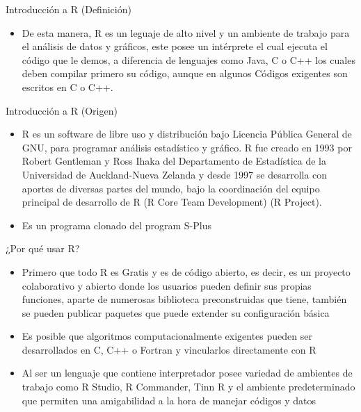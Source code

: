 \documentclass[ignorenonframetext,]{beamer}
\providecommand{\tightlist}{%
  \setlength{\itemsep}{0pt}\setlength{\parskip}{0pt}}
\begin{document}
\begin{frame}{Introducción a R (Definición)}

\begin{itemize}
\tightlist
\item
  De esta manera, R es un leguaje de alto nivel y un ambiente de trabajo
  para el análisis de datos y gráficos, este posee un intérprete el cual
  ejecuta el código que le demos, a diferencia de lenguajes como Java, C
  o C++ los cuales deben compilar primero su código, aunque en algunos
  Códigos exigentes son escritos en C o C++.
\end{itemize}

\end{frame}

\begin{frame}{Introducción a R (Origen)}

\begin{itemize}
\item
  R es un software de libre uso y distribución bajo Licencia Pública
  General de GNU, para programar análisis estadístico y gráfico. R fue
  creado en 1993 por Robert Gentleman y Ross Ihaka del Departamento de
  Estadística de la Universidad de Auckland-Nueva Zelanda y desde 1997
  se desarrolla con aportes de diversas partes del mundo, bajo la
  coordinación del equipo principal de desarrollo de R (R Core Team
  Development) (R Project).
\item
  Es un programa clonado del program S-Plus
\end{itemize}

\end{frame}

\begin{frame}{¿Por qué usar R?}

\begin{itemize}
\item
  Primero que todo R es Gratis y es de código abierto, es decir, es un
  proyecto colaborativo y abierto donde los usuarios pueden definir sus
  propias funciones, aparte de numerosas biblioteca preconstruidas que
  tiene, también se pueden publicar paquetes que puede extender su
  configuración básica
\item
  Es posible que algoritmos computacionalmente exigentes pueden ser
  desarrollados en C, C++ o Fortran y vincularlos directamente con R
\item
  Al ser un lenguaje que contiene interpretador posee variedad de
  ambientes de trabajo como R Studio, R Commander, Tinn R y el ambiente
  predeterminado que permiten una amigabilidad a la hora de manejar
  códigos y datos
\end{itemize}

\end{frame}
\end{document}
